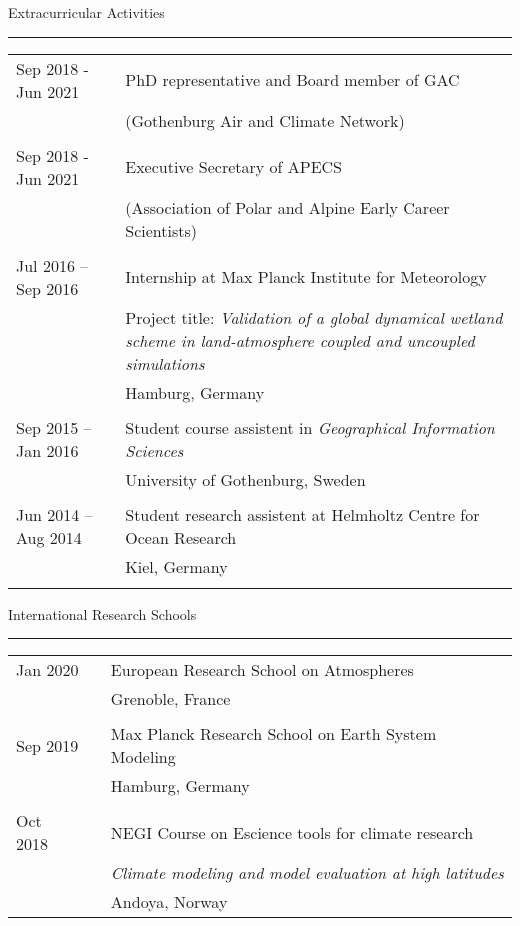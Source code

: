 \documentclass[a4paper,12pt]{article}
\begin{document}
\begin{titlepage}
\flushleft\large Extracurricular Activities
\\[-2ex]
\rule{1\textwidth}{0.7pt}
\smallskip
\begin{table}[h!]
  \begin{tabular}{p{3.7cm}p{0.5cm}|p{12cm}}
 Sep 2018 - Jun 2021 && PhD representative and Board member of GAC \\
  && (Gothenburg Air and Climate Network)\\
  &&\\
 Sep 2018 - Jun 2021 && Executive Secretary of APECS \\
  && (Association of Polar and Alpine Early Career Scientists)\\
  &&\\
	Jul 2016 -- Sep 2016 & & Internship at Max Planck Institute for Meteorology \\
  && Project title: \textit{Validation of a global dynamical wetland scheme in land-atmosphere coupled and uncoupled simulations}\\
	& & Hamburg, Germany \\
  &&\\
	Sep 2015 -- Jan 2016 & & Student course assistent in \textit{Geographical Information Sciences}\\
  &&  University of Gothenburg, Sweden\\
  &&\\
	Jun 2014 -- Aug 2014 & & Student research assistent at Helmholtz Centre for Ocean Research \\
	&& Kiel, Germany \\
	& & \\[-1.7ex]
	\end{tabular}
\end{table}


\flushleft\large International Research Schools 
\\[-2ex]
\rule{1\textwidth}{0.7pt}
\smallskip
\begin{table}[h!]
  \begin{tabular}{p{3.7cm}p{0.5cm}|p{12.5cm}}
 Jan 2020 && European Research School on Atmospheres\\
  && Grenoble, France\\
 &&\\
 Sep 2019 &&  Max Planck Research School on Earth System Modeling \\
  && Hamburg, Germany\\
 &&\\
 Oct 2018 && NEGI Course on Escience tools for climate research\\
 &&\textit{Climate modeling and model evaluation at high latitudes}\\
 && Andoya, Norway\\


\end{tabular}
\end{table}
\end{titlepage}
\end{document}
